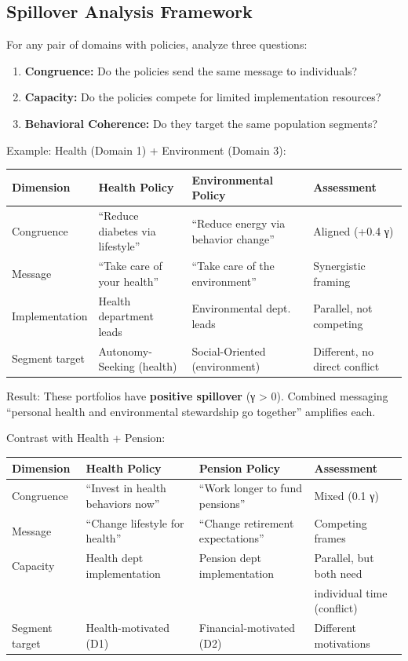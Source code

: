 \subsection{Spillover Analysis Framework}

For any pair of domains with policies, analyze three questions:

\begin{enumerate}
\item \textbf{Congruence:} Do the policies send the same message to individuals?
\item \textbf{Capacity:} Do the policies compete for limited implementation resources?
\item \textbf{Behavioral Coherence:} Do they target the same population segments?
\end{enumerate}

Example: Health (Domain 1) + Environment (Domain 3):

\begin{center}
\begin{tabular}{@{}llll@{}}
\toprule
\textbf{Dimension} & \textbf{Health Policy} & \textbf{Environmental Policy} & \textbf{Assessment} \\
\midrule
Congruence & ``Reduce diabetes via lifestyle'' & ``Reduce energy via behavior change'' & Aligned (+0.4 γ) \\
Message & ``Take care of your health'' & ``Take care of the environment'' & Synergistic framing \\
Implementation & Health department leads & Environmental dept. leads & Parallel, not competing \\
Segment target & Autonomy-Seeking (health) & Social-Oriented (environment) & Different, no direct conflict \\
\midrule
\end{tabular}
\end{center}

Result: These portfolios have \textbf{positive spillover} (γ > 0). Combined messaging ``personal health and environmental stewardship go together'' amplifies each.

Contrast with Health + Pension:

\begin{center}
\begin{tabular}{@{}llll@{}}
\toprule
\textbf{Dimension} & \textbf{Health Policy} & \textbf{Pension Policy} & \textbf{Assessment} \\
\midrule
Congruence & ``Invest in health behaviors now'' & ``Work longer to fund pensions'' & Mixed (0.1 γ) \\
Message & ``Change lifestyle for health'' & ``Change retirement expectations'' & Competing frames \\
Capacity & Health dept implementation & Pension dept implementation & Parallel, but both need \\
& & & individual time (conflict) \\
Segment target & Health-motivated (D1) & Financial-motivated (D2) & Different motivations \\
\midrule
\end{tabular}
\end{center}

